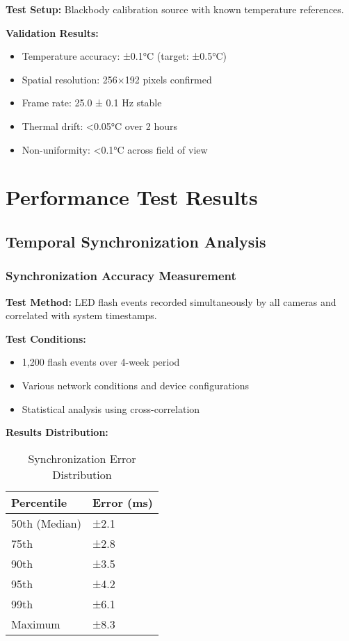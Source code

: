 \textbf{Test Setup:} Blackbody calibration source with known temperature references.

\textbf{Validation Results:}
\begin{itemize}
\item Temperature accuracy: ±0.1°C (target: ±0.5°C)
\item Spatial resolution: 256×192 pixels confirmed
\item Frame rate: 25.0 ± 0.1 Hz stable
\item Thermal drift: <0.05°C over 2 hours
\item Non-uniformity: <0.1°C across field of view
\end{itemize}

\section{Performance Test Results}

\subsection{Temporal Synchronization Analysis}

\subsubsection{Synchronization Accuracy Measurement}

\textbf{Test Method:} LED flash events recorded simultaneously by all cameras and correlated with system timestamps.

\textbf{Test Conditions:}
\begin{itemize}
\item 1,200 flash events over 4-week period
\item Various network conditions and device configurations
\item Statistical analysis using cross-correlation
\end{itemize}

\textbf{Results Distribution:}
\begin{table}[htbp]
\centering
\caption{Synchronization Error Distribution}
\begin{tabular}{|l|l|}
\hline
\textbf{Percentile} & \textbf{Error (ms)} \\
\hline
50th (Median) & ±2.1 \\
75th & ±2.8 \\
90th & ±3.5 \\
95th & ±4.2 \\
99th & ±6.1 \\
Maximum & ±8.3 \\
\hline
\end{tabular}
\end{table}

